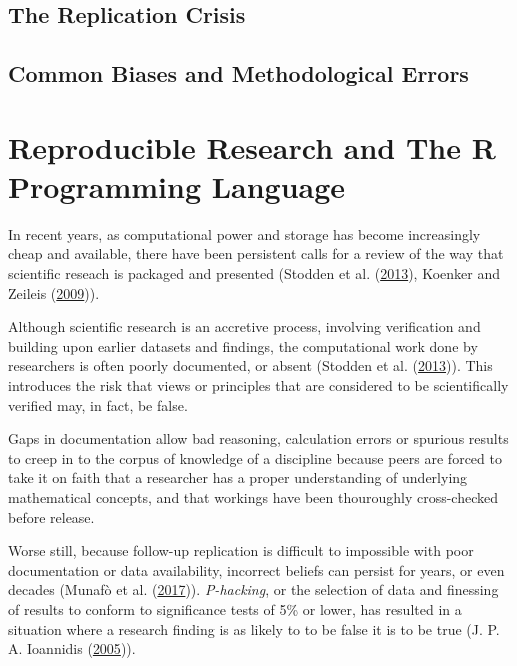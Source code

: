\documentclass[11pt,preprint, authoryear]{elsarticle}
\numberwithin{equation}{section}
\numberwithin{figure}{section}
\numberwithin{table}{section}
\begin{document}
\subsection{The Replication Crisis}\label{the-replication-crisis}

\subsection{Common Biases and Methodological
Errors}\label{common-biases-and-methodological-errors}

\section{\texorpdfstring{Reproducible Research and The R Programming
Language\label{Reproducible Research}}{Reproducible Research and The R Programming Language}}\label{reproducible-research-and-the-r-programming-language}

In recent years, as computational power and storage has become
increasingly cheap and available, there have been persistent calls for a
review of the way that scientific reseach is packaged and presented
(Stodden et al. (\protect\hyperlink{ref-Stodden2013}{2013}), Koenker and
Zeileis (\protect\hyperlink{ref-Koenker2009}{2009})).

Although scientific research is an accretive process, involving
verification and building upon earlier datasets and findings, the
computational work done by researchers is often poorly documented, or
absent (Stodden et al. (\protect\hyperlink{ref-Stodden2013}{2013})).
This introduces the risk that views or principles that are considered to
be scientifically verified may, in fact, be false.

Gaps in documentation allow bad reasoning, calculation errors or
spurious results to creep in to the corpus of knowledge of a discipline
because peers are forced to take it on faith that a researcher has a
proper understanding of underlying mathematical concepts, and that
workings have been thouroughly cross-checked before release.

Worse still, because follow-up replication is difficult to impossible
with poor documentation or data availability, incorrect beliefs can
persist for years, or even decades (Munafò et al.
(\protect\hyperlink{ref-Munafo2017}{2017})). \emph{P-hacking}, or the
selection of data and finessing of results to conform to significance
tests of 5\% or lower, has resulted in a situation where a research
finding is as likely to to be false it is to be true (J. P. A. Ioannidis
(\protect\hyperlink{ref-Ioannidis2005}{2005})).
\end{document}
